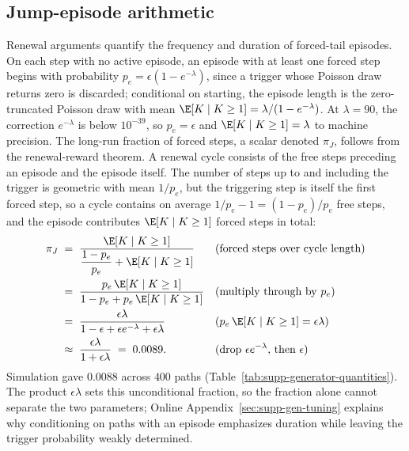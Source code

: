 \subsection{Jump-episode arithmetic}
\label{sec:supp-gen-renewal}

Renewal arguments quantify the frequency and duration of forced-tail episodes. On each step with no active episode, an episode with at
least one forced step begins with probability
$p_e = \epsilon (1 - e^{-\lambda})$, since a trigger whose Poisson
draw returns zero is discarded; conditional on starting, the episode
length is the zero-truncated Poisson draw with mean
$\E[K \mid K \ge 1] = \lambda / (1 - e^{-\lambda})$. At $\lambda =
90$, the correction $e^{-\lambda}$ is below $10^{-39}$, so $p_e =
\epsilon$ and $\E[K \mid K \ge 1] = \lambda$ to machine precision.
The long-run fraction of forced steps, a scalar denoted $\pi_J$,
follows from the renewal-reward theorem. A renewal cycle consists of
the free steps preceding an episode and the episode itself. The number
of steps up to and including the trigger is geometric with mean
$1/p_e$, but the triggering step is itself the first forced step, so
a cycle contains on average $1/p_e - 1 = (1 - p_e)/p_e$ free steps,
and the episode contributes $\E[K \mid K \ge 1]$ forced steps in
total:
\begin{align}
  \pi_J
   &\;=\; \frac{\E[K \mid K \ge 1]}
     {\dfrac{1 - p_e}{p_e} + \E[K \mid K \ge 1]}
     && \text{(forced steps over cycle length)} \notag \\
   &\;=\; \frac{p_e\, \E[K \mid K \ge 1]}
     {1 - p_e + p_e\, \E[K \mid K \ge 1]}
     && \text{(multiply through by $p_e$)} \notag \\
   &\;=\; \frac{\epsilon \lambda}
     {1 - \epsilon + \epsilon e^{-\lambda} + \epsilon \lambda}
     && \text{($p_e\, \E[K \mid K \ge 1] = \epsilon \lambda$)} \notag \\
   &\;\approx\; \frac{\epsilon \lambda}{1 + \epsilon \lambda}
     \;=\; 0.0089.
     && \text{(drop $\epsilon e^{-\lambda}$, then $\epsilon$)}
  \label{eq:supp-rho}
\end{align}
Simulation gave $0.0088$ across $400$ paths (Table~\ref{tab:supp-generator-quantities}). The product
$\epsilon \lambda$ sets this unconditional fraction, so the fraction
alone cannot separate the two parameters; Online Appendix~\ref{sec:supp-gen-tuning} explains why conditioning
on paths with an episode emphasizes duration while leaving the
trigger probability weakly determined.


